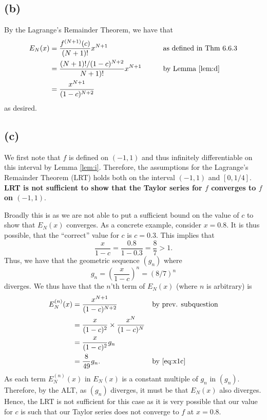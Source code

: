 \documentclass[10pt]{article}
\begin{document}
\subsection*{(b)}
By the Lagrange's Remainder Theorem, we have that
\begin{alignat*}{2}
    E_N(x)&= \frac{f^{(N+1)}(c)}{(N+1)!}x^{N+1} &&\text{as defined in Thm 6.6.3}\\
    &= \frac{(N+1)!/(1-c)^{N+2}}{N+1)!}x^{N+1}\qquad&&\text{by Lemma \ref{lem:d}}\\
    &=\frac{x^{N+1}}{(1-c)^{N+2}}
\end{alignat*}
as desired.
\subsection*{(c)}

We first note that $f$ is defined on $(-1,1)$ and thus infinitely differentiable on this interval by Lemma \ref{lem:i}. Therefore, the assumptions for the Lagrange's Remainder Theorem (LRT) holds both on the interval $(-1,1)$ and $[0, 1/4]$.\\

\noindent
\textbf{LRT is not sufficient to show that the Taylor series for $f$ converges to $f$ on $(-1,1).$}

Broadly this is as we are not able to put a sufficient bound on the value of $c$ to show that $E_N(x)$ converges.
As a concrete example, consider $x=0.8.$ It is thus possible, that the ``correct'' value for $c$ is $c=0.3.$ %
This implies that 
\begin{equation} \label{eq:x1c}
    \frac{x}{1-c} = \frac{0.8}{1-0.3} = \frac{8}{7}> 1.
\end{equation}
Thus, we have that the geometric sequence $(g_n)$ where
\[g_n = \left( \frac{x}{1-c}\right ) ^n = \left( 8/7\right ) ^n\] 
diverges. We thus have that the $n$'th term of $E_N(x)$ (where $n$ is arbitrary) 
is
\begin{alignat}{2}\label{eq:simp}
    E_N^{(n)}(x) &= \frac{x^{N+1}}{(1-c)^{N+2}}\nonumber \qquad&&\text{by prev. subquestion}\\
    &= \frac{x}{(1-c)^2}\times\frac{x^{N}}{(1-c)^{N}}\nonumber\\
    &=\frac{x}{(1-c)^2}g_n \\
    &= \frac{8}{49}g_n. &&\text{by \eqref{eq:x1c}} \nonumber
\end{alignat}
As each term $E^{(n)}_N(x)$ in $E_N(x)$ is a constant multiple of $g_n$ in $(g_n)$.
Therefore, by the ALT, as $(g_n)$ diverges, it must be that $E_N(x)$ also
diverges. Hence, the LRT is not sufficient for this case as it is very possible that our value for $c$ is such that our Taylor series does not converge to $f$ at $x=0.8.$\\
\end{document}
